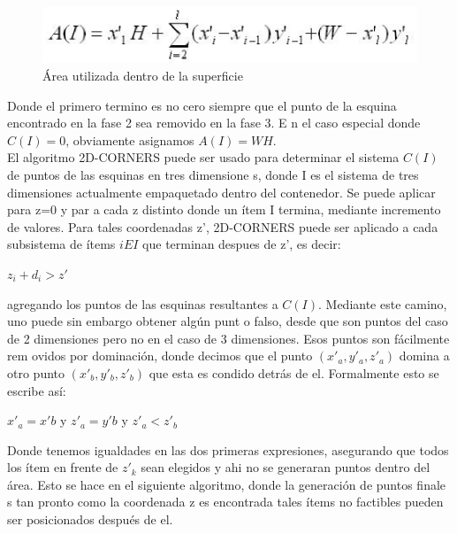 \begin{figure}[!htb]
\centering
\includegraphics[scale=0.6]{fotos/foto3.eps}
\caption{Área utilizada dentro de la superficie}
\end{figure}

Donde el primero termino es no cero siempre que el punto de la esquina encontrado en la fase 2 sea removido en la fase 3. E
n el caso especial donde \(C(I)=0\), obviamente asignamos \(A(I)=WH\).\\
El algoritmo 2D-CORNERS puede ser usado para determinar el sistema \(C(I)\) de puntos de las esquinas en tres dimensione
s, donde I es el sistema de tres dimensiones actualmente empaquetado dentro del contenedor. Se puede aplicar para z=0 y par
a cada z distinto donde un ítem I termina, mediante incremento de valores. Para tales coordenadas z', 2D-CORNERS puede ser
aplicado a cada subsistema de ítems \(i E I\) que terminan despues de z', es decir:\\

\begin{center}
\(z_i + d_i >z'\)
\end{center}
agregando los puntos de las esquinas resultantes a \(C(I)\). Mediante este camino, uno puede sin embargo obtener algún punt
o falso, desde que son puntos del caso de 2 dimensiones pero no en el caso de 3 dimensiones. Esos puntos son fácilmente rem
ovidos por dominación, donde decimos que el punto \((x'_a,y'_a,z'_a)\) domina a otro punto \((x'_b,y'_b,z'_b)\) que esta es
condido detrás de el. Formalmente esto se escribe así:

\begin{center}
\(x'_a=x'b\) y \( z'_a=y'b\) y \(z'_a < z'_b\)\\
\end{center}
Donde tenemos igualdades en las dos primeras expresiones, asegurando que todos los ítem en frente de \(z'_k\) sean elegidos
 y ahi no se generaran puntos dentro del área. Esto se hace en el siguiente algoritmo, donde la generación de puntos finale
s tan pronto como la coordenada z es encontrada tales ítems no factibles pueden ser posicionados después de el.\\

